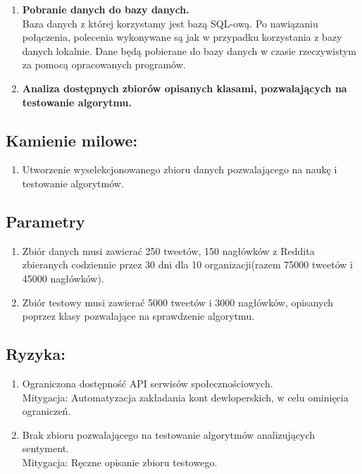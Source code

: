 \documentclass[a4paper,11pt, notitlepage ]{article}
\begin{document}
\begin{enumerate}
    \item \textbf{Pobranie danych do bazy danych.}\\
    Baza danych z której korzystamy jest bazą SQL-ową. Po nawiązaniu połączenia, polecenia wykonywane są jak w przypadku korzystania z bazy danych lokalnie. Dane będą pobierane do bazy danych w czasie rzeczywistym za pomocą opracowanych programów.
    \item \textbf{Analiza dostępnych zbiorów opisanych klasami, pozwalających na testowanie algorytmu.}
\end{enumerate}
\subsection{Kamienie milowe:}
\begin{enumerate}
    \item Utworzenie wyselekcjonowanego zbioru danych pozwalającego na naukę i testowanie algorytmów.
\end{enumerate}
\subsection{Parametry}
\begin{enumerate}
    \item Zbiór danych musi zawierać 250 tweetów, 150 nagłówków z Reddita zbieranych codziennie przez 30 dni dla 10 organizacji(razem 75000 tweetów i 45000 nagłówków).
    \item Zbiór testowy musi zawierać 5000 tweetów i 3000 nagłówków, opisanych poprzez klasy pozwalające na sprawdzenie algorytmu.
\end{enumerate}
\subsection{Ryzyka:}
\begin{enumerate}
    \item Ograniczona dostępność API serwisów społecznościowych.\\
 Mitygacja: Automatyzacja zakładania kont dewloperskich, w celu ominięcia ograniczeń.
 \item Brak zbioru pozwalającego na testowanie algorytmów analizujących sentyment.\\
 Mitygacja: Ręczne opisanie zbioru testowego.
\end{enumerate}
\end{document}
